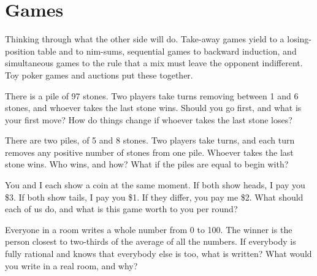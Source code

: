\chapter{Games}\label{ch:iv1:games}

\begin{ivtrains}
Thinking through what the other side will do. Take-away games yield to a losing-position table and to nim-sums, sequential games to backward induction, and simultaneous games to the rule that a mix must leave the opponent indifferent. Toy poker games and auctions put these together.
\end{ivtrains}

\begin{question}\label{iq:iv1:games:1}
There is a pile of 97 stones. Two players take turns removing between 1 and 6 stones, and whoever takes the last stone wins. Should you go first, and what is your first move? How do things change if whoever takes the last stone loses?
\end{question}

\begin{question}\label{iq:iv1:games:2}
There are two piles, of 5 and 8 stones. Two players take turns, and each turn removes any positive number of stones from one pile. Whoever takes the last stone wins. Who wins, and how? What if the piles are equal to begin with?
\end{question}

\begin{question}\label{iq:iv1:games:3}
You and I each show a coin at the same moment. If both show heads, I pay you \$3. If both show tails, I pay you \$1. If they differ, you pay me \$2. What should each of us do, and what is this game worth to you per round?
\end{question}

\begin{question}\label{iq:iv1:games:4}
Everyone in a room writes a whole number from 0 to 100. The winner is the person closest to two-thirds of the average of all the numbers. If everybody is fully rational and knows that everybody else is too, what is written? What would you write in a real room, and why?
\end{question}

